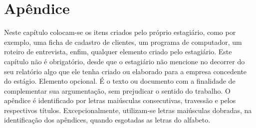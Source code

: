 \chapter{Apêndice}
\label{cap:apendice}

Neste capítulo colocam-se os itens criados pelo próprio estagiário, como por exemplo, uma ficha de cadastro de clientes, um programa de computador, um roteiro de entrevista, enfim, qualquer elemento criado pelo estagiário. Este capítulo não é obrigatório, desde que o estagiário não mencione no decorrer do seu relatório algo que ele tenha criado ou elaborado para a empresa concedente do estágio. Elemento opcional. 
É o texto ou documento com a finalidade de complementar sua argumentação, sem prejudicar o sentido do trabalho. O apêndice é identificado por letras maiúsculas consecutivas, travessão e pelos respectivos títulos. Excepcionalmente, utilizam-se letras maiúsculas dobradas, na identificação dos apêndices, quando esgotadas as letras do alfabeto.